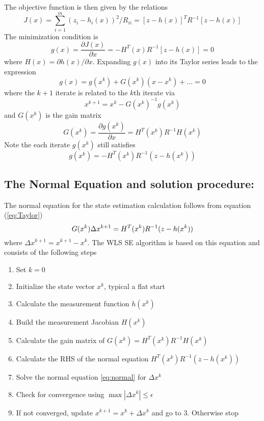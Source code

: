 \documentclass[12pt]{article}
\begin{document}
The objective function is then given by the relations
\begin{equation}\label{eq:JX}
J(x)=\sum_{i=1}^{m}(z_i-h_i(x))^2/R_{ii} = [z-h(x)]^TR^{-1}[z-h(x)] 
\end{equation} 
The minimization condition is
\begin{equation}\label{eq:gx}
g(x)=\frac{\partial J(x)}{\partial x} = -H^T(x)R^{-1}[z-h(x)] = 0 
\end{equation} 
where $H(x)=\partial h(x)/\partial x$. Expanding $g(x)$ into its Taylor series
leads to the expression
\begin{equation}\label{eq:Taylor}
g(x)= g(x^k) + G(x^k)(x-x^k) + ... = 0
\end{equation} 
where the $k+1$ iterate is related to the $k$th iterate via
\[
x^{k+1} = x^k - G(x^k)^{-1}g(x^k)
\]
and $G(x^k)$ is the gain matrix
\[
G(x^k) = \frac{\partial g(x^k)}{\partial x} = H^T(x^k)R^{-1}H(x^k)
\]
Note the each iterate $g(x^k)$ still satisfies
\[
g(x^k) = -H^T(x^k)R^{-1}(z-h(x^k))
\]

\subsection*{The Normal Equation and solution procedure:}
The normal equation for the state estimation calculation follows from
equation (\ref{eq:Taylor})
\begin{equation}\label{eq:normal}
G(x^k)\Delta x^{k+1} = H^T(x^k)R^{-1}(z-h(x^k)) \\*
\end{equation} 
where $\Delta x^{k+1} = x^{k+1}-x^k$. The WLS SE algorithm is based on this
equation and consists of the following steps
\begin{enumerate}
\item Set $k=0$
\item Initialize the state vector $x^{k}$, typical a flat start
\item Calculate the measurement function $h(x^k)$
\item Build the measurement Jacobian $H(x^k)$
\item Calculate the gain matrix of $G(x^k)= H^T(x^k)R^{-1}H(x^k)$
\item Calculate the RHS of the normal equation $H^T(x^k)R^{-1}(z-h(x^k))$
\item Solve the normal equation \ref{eq:normal} for $\Delta x^k$
\item Check for convergence using $\max \left |  \Delta x^k \right |\le \epsilon $
\item If not converged, update $x^{k+1} = x^k+\Delta x^k$ and go to 3. Otherwise
stop
\end{enumerate}
\end{document}
